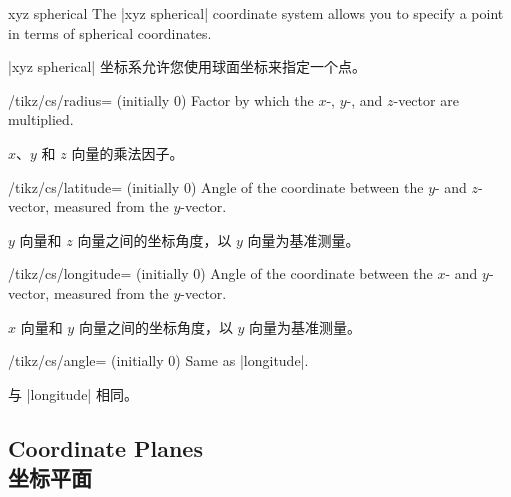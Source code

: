 \begin{coordinatesystem}{xyz spherical}
    The |xyz spherical| coordinate system allows you to specify a point in
    terms of spherical coordinates.
    
    |xyz spherical| 坐标系允许您使用球面坐标来指定一个点。


    \begin{key}{/tikz/cs/radius= (initially 0)}
        Factor by which the $x$-, $y$-, and $z$-vector are multiplied.

        $x$、$y$ 和 $z$ 向量的乘法因子。


    \end{key}
    \begin{key}{/tikz/cs/latitude= (initially 0)}
        Angle of the coordinate between the $y$- and $z$-vector, measured from
        the $y$-vector.

        $y$ 向量和 $z$ 向量之间的坐标角度，以 $y$ 向量为基准测量。


    \end{key}
    \begin{key}{/tikz/cs/longitude= (initially 0)}
        Angle of the coordinate between the $x$- and $y$-vector, measured from
        the $y$-vector.

        $x$ 向量和 $y$ 向量之间的坐标角度，以 $y$ 向量为基准测量。


    \end{key}
    \begin{key}{/tikz/cs/angle= (initially 0)}
        Same as |longitude|.

        与 |longitude| 相同。


    \end{key}
\begin{codeexample}[preamble={\usetikzlibrary{3d}}]
\end{codeexample}
\end{coordinatesystem}


\subsection{Coordinate Planes\\坐标平面}

